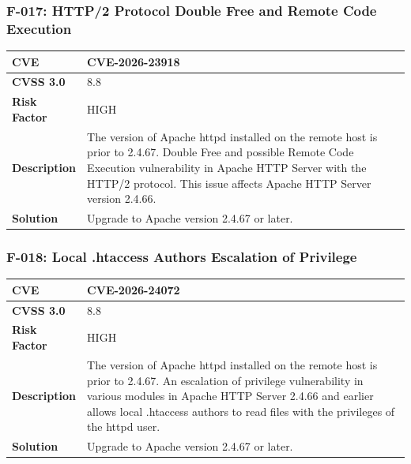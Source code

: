 \subsubsection{F-017: HTTP/2 Protocol Double Free and Remote Code Execution}
\begin{tabular}{|p{2.8cm}|p{12.2cm}|}
\hline
\textbf{CVE} & CVE-2026-23918 \\ \hline
\textbf{CVSS 3.0} & 8.8 \\ \hline
\textbf{Risk Factor} & HIGH \\ \hline
\textbf{Description} & The version of Apache httpd installed on the remote host is prior to 2.4.67. Double Free and possible Remote Code Execution vulnerability in Apache HTTP Server with the HTTP/2 protocol. This issue affects Apache HTTP Server version 2.4.66. \\ \hline
\textbf{Solution} & Upgrade to Apache version 2.4.67 or later. \\ \hline
\end{tabular}

\subsubsection{F-018: Local .htaccess Authors Escalation of Privilege}
\begin{tabular}{|p{2.8cm}|p{12.2cm}|}
\hline
\textbf{CVE} & CVE-2026-24072 \\ \hline
\textbf{CVSS 3.0} & 8.8 \\ \hline
\textbf{Risk Factor} & HIGH \\ \hline
\textbf{Description} & The version of Apache httpd installed on the remote host is prior to 2.4.67. An escalation of privilege vulnerability in various modules in Apache HTTP Server 2.4.66 and earlier allows local .htaccess authors to read files with the privileges of the httpd user. \\ \hline
\textbf{Solution} & Upgrade to Apache version 2.4.67 or later. \\ \hline
\end{tabular}

